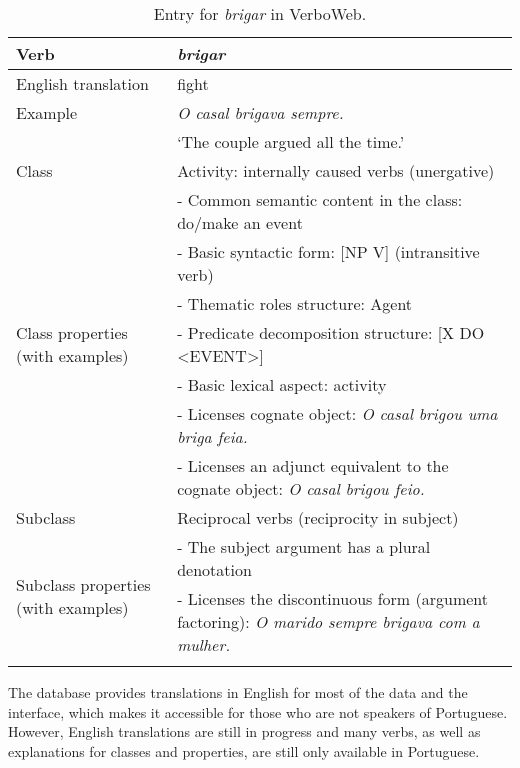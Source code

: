 \documentclass[english]{textolivre}
\begin{document}
\begin{table}[h!]
\centering
\begin{threeparttable}
\caption{Entry for \textit{brigar} in VerboWeb.}
\label{Table7}
\begin{tabular}{p{}p{}} 
\toprule
Verb &	\textit{brigar} \\
\midrule
\arrayrulecolor[gray]{.7}
English translation	& fight \\
\midrule
Example	& \textit{O casal brigava sempre.} \\
& ‘The couple argued all the time.’\\
\midrule
Class & Activity: internally caused verbs (unergative) \\
\midrule
\multirow{7}{=}{Class properties \newline (with examples)} & 
- Common semantic content in the class: do/make an event \\
& - Basic syntactic form: [NP V] (intransitive verb) \\
& - Thematic roles structure: {Agent} \\ 
& - Predicate decomposition structure: [X DO <EVENT>] \\
& - Basic lexical aspect: activity \\
& - Licenses cognate object: \textit{O casal brigou uma briga feia.} \\
& - Licenses an adjunct equivalent to the cognate object: \textit{O casal  brigou feio.}\protect\footnotemark \\
\midrule
Subclass & Reciprocal verbs (reciprocity in subject) \\
\midrule
\multirow{2}{=}{Subclass properties \newline (with examples)} & 
- The subject argument has a plural denotation \\
& - Licenses the discontinuous form (argument factoring): \textit{O marido sempre brigava com a mulher.} \\
\arrayrulecolor{black}
\bottomrule
\end{tabular}
\end{threeparttable}
\end{table}

The database provides translations in English for most of the data and the interface, which makes it accessible for those who are not speakers of Portuguese. However, English translations are still in progress and many verbs, as well as explanations for classes and properties, are still only available in Portuguese.
\end{document}
